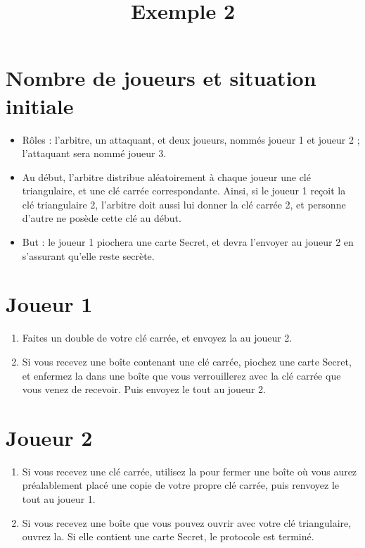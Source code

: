 \documentclass[a4paper,10pt]{article}
\title{Exemple 2}
\begin{document}
\maketitle

\section{Nombre de joueurs et situation initiale}
\begin{itemize}
	\item Rôles : l'arbitre, un attaquant, et deux joueurs, nommés joueur 1 et joueur 2 ; l'attaquant sera nommé joueur 3.
	\item Au début, l'arbitre distribue aléatoirement à chaque joueur une clé triangulaire, et une clé carrée correspondante. Ainsi, si le joueur 1 reçoit la clé triangulaire 2, l'arbitre doit aussi lui donner la clé carrée 2, et personne d'autre ne posède cette clé au début.
	\item But : le joueur 1 piochera une carte Secret, et devra l'envoyer au joueur 2 en s'assurant qu'elle reste secrète.
\end{itemize}




\section{Joueur 1}
\begin{enumerate}
	\item Faites un double de votre clé carrée, et envoyez la au joueur 2.
	\item Si vous recevez une boîte contenant une clé carrée, piochez une carte Secret, et enfermez la dans une boîte que vous verrouillerez avec la clé carrée que vous venez de recevoir. Puis envoyez le tout au joueur 2.
\end{enumerate}

\section{Joueur 2}
\begin{enumerate}
	\item Si vous recevez une clé carrée, utilisez la pour fermer une boîte où vous aurez préalablement placé une copie de votre propre clé carrée, puis renvoyez le tout au joueur 1.
	\item Si vous recevez une boîte que vous pouvez ouvrir avec votre clé triangulaire, ouvrez la. Si elle contient une carte Secret, le protocole est terminé.
\end{enumerate}
\end{document}
